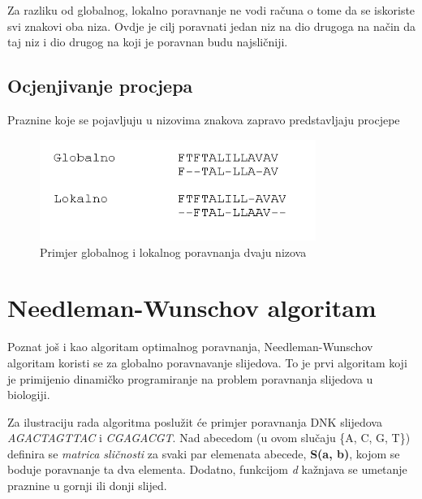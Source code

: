 \documentclass[times, utf8, zavrsni]{fer}
\begin{document}
Za razliku od globalnog, lokalno poravnanje ne vodi računa o tome da se iskoriste svi znakovi oba niza. Ovdje je cilj poravnati jedan niz na dio drugoga na način da taj niz i dio drugog na koji je poravnan budu najsličniji.

\section{Ocjenjivanje procjepa}

\indent
Praznine koje se pojavljuju u nizovima znakova zapravo predstavljaju procjepe



\begin{figure}[ht!]
\centering
\includegraphics[width=90mm]{poravnanje.png}
\caption{Primjer globalnog i lokalnog poravnanja dvaju nizova}
\label{poravnanje}
\end{figure}

\chapter{Needleman-Wunschov algoritam}
\indent

Poznat još i kao algoritam optimalnog poravnanja, Needleman-Wunschov algoritam koristi se za globalno poravnavanje slijedova. To je prvi algoritam koji je primijenio dinamičko programiranje na problem poravnanja slijedova u biologiji.

Za ilustraciju rada algoritma poslužit će primjer poravnanja DNK slijedova \textit{AGACTAGTTAC} i \textit{CGAGACGT}.
Nad abecedom (u ovom slučaju \{A, C, G, T\}) definira se \textit{matrica sličnosti} za svaki par elemenata abecede, \textbf{S(a, b)}, kojom se boduje poravnanje ta dva elementa. Dodatno, funkcijom \textit{d} kažnjava se umetanje praznine u gornji ili donji slijed.
\end{document}
